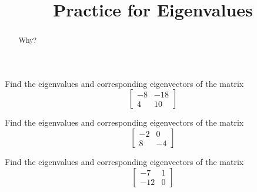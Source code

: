 \documentclass{ximera}
\title{Practice for Eigenvalues}
\begin{document}
\begin{abstract}
Why?
\end{abstract}
\maketitle


\begin{exercise}%
    Find the eigenvalues and corresponding eigenvectors of the matrix 
    \[ 
        \begin{bmatrix} -8 & -18 \\ 4 & 10 \end{bmatrix} 
    \]
\end{exercise}

\begin{exercise}%
    Find the eigenvalues and corresponding eigenvectors of the matrix 
    \[ 
        \begin{bmatrix} -2 & 0 \\ 8 & -4 \end{bmatrix} 
    \]
\end{exercise}

\begin{exercise}%
    Find the eigenvalues and corresponding eigenvectors of the matrix 
    \[ 
        \begin{bmatrix} -7 & 1 \\ -12 & 0 \end{bmatrix} 
    \]
\end{exercise}
\end{document}
